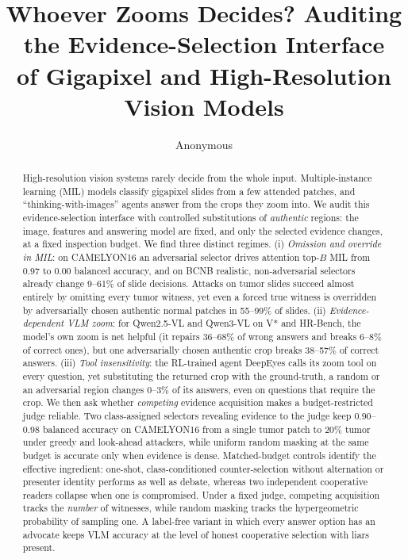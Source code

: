 \documentclass[10pt,twocolumn,letterpaper]{article}
\title{Whoever Zooms Decides? Auditing the Evidence-Selection Interface\\of Gigapixel and High-Resolution Vision Models}
\author{Anonymous}
\begin{document}
\maketitle

\begin{abstract}
High-resolution vision systems rarely decide from the whole input. Multiple-instance learning (MIL) models classify gigapixel slides from a few attended patches, and ``thinking-with-images'' agents answer from the crops they zoom into. We audit this evidence-selection interface with controlled substitutions of \emph{authentic} regions: the image, features and answering model are fixed, and only the selected evidence changes, at a fixed inspection budget.
We find three distinct regimes. (i) \emph{Omission and override in MIL}: on CAMELYON16 an adversarial selector drives attention top-$B$ MIL from 0.97 to 0.00 balanced accuracy, and on BCNB realistic, non-adversarial selectors already change 9--61\% of slide decisions. Attacks on tumor slides succeed almost entirely by omitting every tumor witness, yet even a forced true witness is overridden by adversarially chosen authentic normal patches in 55--99\% of slides. (ii) \emph{Evidence-dependent VLM zoom}: for Qwen2.5-VL and Qwen3-VL on V* and HR-Bench, the model's own zoom is net helpful (it repairs 36--68\% of wrong answers and breaks 6--8\% of correct ones), but one adversarially chosen authentic crop breaks 38--57\% of correct answers. (iii) \emph{Tool insensitivity}: the RL-trained agent DeepEyes calls its zoom tool on every question, yet substituting the returned crop with the ground-truth, a random or an adversarial region changes 0--3\% of its answers, even on questions that require the crop.
We then ask whether \emph{competing} evidence acquisition makes a budget-restricted judge reliable. Two class-assigned selectors revealing evidence to the judge keep 0.90--0.98 balanced accuracy on CAMELYON16 from a single tumor patch to 20\% tumor under greedy and look-ahead attackers, while uniform random masking at the same budget is accurate only when evidence is dense. Matched-budget controls identify the effective ingredient: one-shot, class-conditioned counter-selection without alternation or presenter identity performs as well as debate, whereas two independent cooperative readers collapse when one is compromised. Under a fixed judge, competing acquisition tracks the \emph{number} of witnesses, while random masking tracks the hypergeometric probability of sampling one. A label-free variant in which every answer option has an advocate keeps VLM accuracy at the level of honest cooperative selection with liars present.
\end{abstract}
\end{document}
